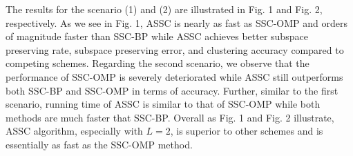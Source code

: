 The results for the scenario (1) and (2) are illustrated in Fig. 1 and Fig. 2, respectively. As we see in Fig. 1, ASSC is nearly as fast as SSC-OMP and orders of magnitude faster than SSC-BP while ASSC achieves better subspace preserving rate, subspace preserving error, and clustering accuracy compared to competing schemes. Regarding the second scenario, we observe that the performance of SSC-OMP is severely deteriorated while ASSC still outperforms both SSC-BP and SSC-OMP in terms of accuracy. Further, similar to the first scenario, running time of ASSC is similar to that of SSC-OMP while both methods are much faster that SSC-BP. Overall as Fig. 1 and Fig. 2 illustrate, ASSC algorithm, especially with $L=2$, is superior to other schemes and is essentially as fast as the SSC-OMP method.

